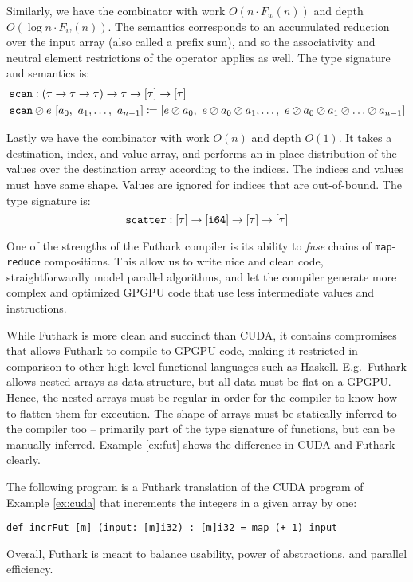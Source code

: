 Similarly, we have the combinator  with work $O(n\cdot F_w(n))$ and depth
$O(\log n \cdot F_w(n))$. The semantics corresponds to an accumulated reduction over
the input array (also called a prefix sum), and so the associativity and neutral
element restrictions of the operator applies as well. The type signature and
semantics is:
\begin{align}
  &\mathtt{scan}:(\tau \to \tau \to \tau) \to \tau \to \mathtt{[}\tau\mathtt{]} \to \mathtt{[}\tau\mathtt{]}\\
  & \mathtt{scan} \oslash e~[a_0,~a_1,\ldots, ~a_{n-1}] \coloneq [e \oslash a_0,~e \oslash a_0 \oslash a_1,\ldots,~e \oslash a_0 \oslash a_1 \oslash \ldots\oslash a_{n-1}]
\end{align}

Lastly we have the combinator  with work $O(n)$ and depth $O(1)$.
It takes a destination, index, and value array, and performs an in-place
distribution of the values over the destination array according to the
indices. The indices and values must have same shape. Values are ignored for
indices that are out-of-bound. The type signature is:
\begin{equation}
\mathtt{scatter}:\mathtt{[}\tau\mathtt{]} \to \mathtt{[}\mathtt{i64}\mathtt{]} \to \mathtt{[}\tau\mathtt{]} \to \mathtt{[}\tau\mathtt{]}
\end{equation}

One of the strengths of the Futhark compiler is its ability to \textit{fuse}
chains of \texttt{map}-\texttt{reduce} compositions. This allow us to write nice
and clean code, straightforwardly model parallel algorithms, and let the
compiler generate more complex and optimized GPGPU code that use less
intermediate values and instructions.

While Futhark is more clean and succinct than CUDA, it contains compromises that
allows Futhark to compile to GPGPU code, making it restricted in comparison to
other high-level functional languages such as Haskell. E.g.\ Futhark allows
nested arrays as data structure, but all data must be flat on a GPGPU. Hence,
the nested arrays must be regular in order for the compiler to know how to
flatten them for execution. The shape of arrays must be statically inferred to
the compiler too -- primarily part of the type signature of functions, but can be
manually inferred. Example \ref{ex:fut} shows the difference in CUDA and Futhark
clearly.

\begin{floatenv}
\begin{example}\label{ex:fut}
  The following program is a Futhark translation of the CUDA program of Example
  \ref{ex:cuda} that increments the integers in a given array by one:
\begin{lstlisting}[language=futhark]
def incrFut [m] (input: [m]i32) : [m]i32 = map (+ 1) input
\end{lstlisting}
\end{example}
\end{floatenv}

Overall, Futhark is meant to balance usability, power of abstractions, and
parallel efficiency.

